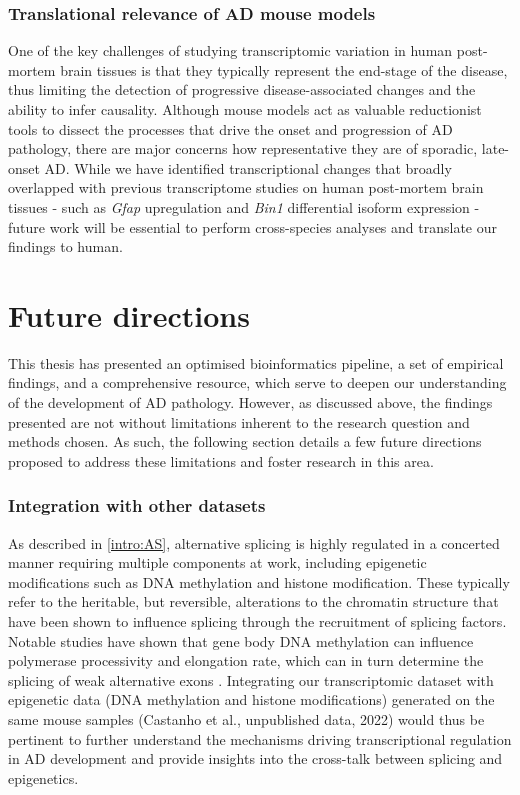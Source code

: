 \subsubsection{Translational relevance of AD mouse models}
One of the key challenges of studying transcriptomic variation in human post-mortem brain tissues is that they typically represent the end-stage of the disease, thus limiting the detection of progressive disease-associated changes and the ability to infer causality. Although mouse models act as valuable reductionist tools to dissect the processes that drive the onset and progression of AD pathology, there are major concerns how representative they are of sporadic, late-onset AD. While we have identified transcriptional changes that broadly overlapped with previous transcriptome studies on human post-mortem brain tissues - such as \textit{Gfap} upregulation and \textit{Bin1} differential isoform expression - future work will be essential to perform cross-species analyses and translate our findings to human.      

\section{Future directions}
This thesis has presented an optimised bioinformatics pipeline, a set of empirical findings, and a comprehensive resource, which serve to deepen our understanding of the development of AD pathology. However, as discussed above, the findings presented are not without limitations inherent to the research question and methods chosen. As such, the following section details a few future directions proposed to address these limitations and foster research in this area.   

\subsubsection{Integration with other datasets} 
As described in \cref{intro:AS}, alternative splicing is highly regulated in a concerted manner requiring multiple components at work, including epigenetic modifications such as DNA methylation and histone modification. These typically refer to the heritable, but reversible, alterations to the chromatin structure that have been shown to influence splicing through the recruitment of splicing factors\cite{Yang2014, Shukla2011, Zhang2020a, Shukla2011, Luco2011}. Notable studies have shown that gene body DNA methylation can influence polymerase processivity and elongation rate, which can in turn determine the splicing of weak alternative exons \cite{Yang2014, Shukla2011}. Integrating our transcriptomic dataset with epigenetic data (DNA methylation and histone modifications) generated on the same mouse samples (Castanho et al., unpublished data, 2022) would thus be pertinent to further understand the mechanisms driving transcriptional regulation in AD development and provide insights into the cross-talk between splicing and epigenetics. 

